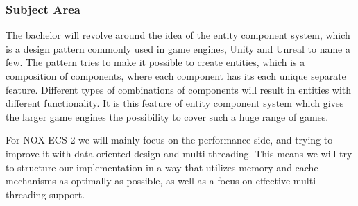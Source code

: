 \subsubsection{Subject Area}
The bachelor will revolve around the idea of the entity component system, which is a design pattern commonly used in game engines, Unity and Unreal to name a few. 
The pattern tries to make it possible to create entities, which is a composition of components, where each component has its each unique separate feature. 
Different types of combinations of components will result in entities with different functionality. 
It is this feature of entity component system which gives the larger game engines the possibility to cover such a huge range of games.

For NOX-ECS 2 we will mainly focus on the performance side, and trying to improve it with data-oriented design and multi-threading. 
This means we will try to structure our implementation in a way that utilizes memory and cache mechanisms as optimally as possible, as well as a focus on effective multi-threading support.